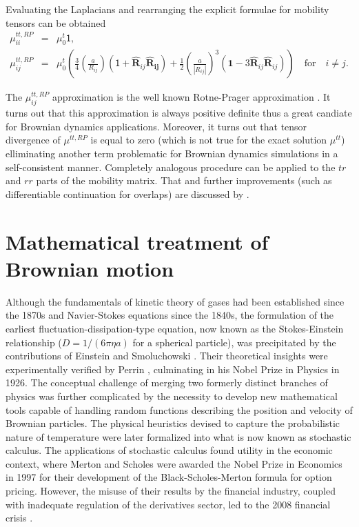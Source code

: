 \documentclass{doctoral}
\newcommand{\mm}[1]{\bm{\mathsf{#1}}} %
\begin{document}
Evaluating the Laplacians and rearranging the explicit formulae for mobility tensors can be obtained
\begin{eqnarray}
    \mm{\mu}_{ii}^{tt,RP} & = & \mu_0^t \mm{1},                                                                                                                                                                                                                                                                  \\
    \mm{\mu}_{ij}^{tt,RP} & = & \mu_0^t \left( \frac{3}{4} \left( \frac{a}{R_{ij}} \right) \left( \mm{1} + \bm{\hat{R}}_{ij} \bm{\hat{R}_{ij}} \right) + \frac{1}{2} \left( \frac{a}{|R_{ij}|} \right)^3 \left( \bm{1} -3  \bm{\hat{R}}_{ij}\bm{\hat{R}}_{ij} \right) \right) \quad \mathrm{for} \quad i \neq j.
    \label{eqn:rotne-prager-translation}
\end{eqnarray}

The $\mm{\mu}_{ij}^{tt,RP}$ approximation is the well known Rotne-Prager approximation \cite{Nagele_2013,Dhont_2008,Kim_2013}.
It turns out that this approximation is always positive definite thus a great candiate for Brownian dynamics applications.
Moreover, it turns out that tensor divergence of $\mm{\mu}^{tt,RP}$ is equal to zero (which is not true for the exact solution $\mm{\mu}^{tt}$) elliminating another term problematic for Brownian dynamics simulations in a self-consistent manner\cite{Ermak_1978}.
Completely analogous procedure can be applied to the $tr$ and $rr$ parts of the mobility matrix.
That and further improvements (such as differentiable continuation for overlaps) are discussed by \textcite{Zuk_2018}.

\section{Mathematical treatment of Brownian motion}
\label{sec:SDE}

Although the fundamentals of kinetic theory of gases had been established since the 1870s and Navier-Stokes equations since the 1840s, the formulation of the earliest fluctuation-dissipation-type equation, now known as the Stokes-Einstein relationship ($D = 1 / (6 \pi \eta a)$ for a spherical particle), was precipitated by the contributions of Einstein \cite{Einstein_1905} and Smoluchowski \cite{Smoluchowski_1906}.
Their theoretical insights were experimentally verified by Perrin \cite{Perrin_1909}, culminating in his Nobel Prize in Physics in 1926.
The conceptual challenge of merging two formerly distinct branches of physics was further complicated by the necessity to develop new mathematical tools capable of handling random functions describing the position and velocity of Brownian particles.
The physical heuristics devised to capture the probabilistic nature of temperature were later formalized into what is now known as stochastic calculus.
The applications of stochastic calculus found utility in the economic context, where Merton and Scholes were awarded the Nobel Prize in Economics in 1997 for their development of the Black-Scholes-Merton formula for option pricing.
However, the misuse of their results by the financial industry, coupled with inadequate regulation of the derivatives sector, led to the 2008 financial crisis \cite{fcic_report}.
\end{document}
